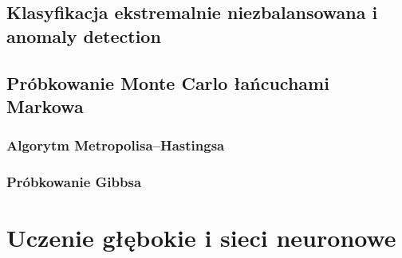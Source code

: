 \documentclass{myclass}
\numberwithin{equation}{section}
\begin{document}
\subsection{Klasyfikacja ekstremalnie niezbalansowana i anomaly detection}


\subsection{Próbkowanie Monte Carlo łańcuchami Markowa}

\subsubsection{Algorytm Metropolisa--Hastingsa}

\subsubsection{Próbkowanie Gibbsa}



\section{Uczenie głębokie i sieci neuronowe}

    
\end{document}
